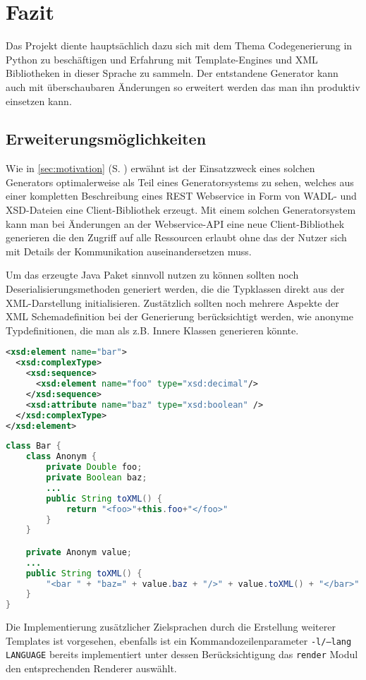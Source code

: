 \section{Fazit}
\label{sec:conclusion}

Das Projekt diente hauptsächlich dazu sich mit dem Thema Codegenerierung in Python zu beschäftigen und Erfahrung mit Template-Engines und XML Bibliotheken in dieser Sprache zu sammeln. Der entstandene Generator kann auch mit überschaubaren Änderungen so erweitert werden das man ihn produktiv einsetzen kann.

\subsection{Erweiterungsmöglichkeiten}
\label{sec:extension}

Wie in \cref{sec:motivation} (S. \pageref{sec:motivation}) erwähnt ist der Einsatzzweck eines solchen Generators optimalerweise als Teil eines Generatorsystems zu sehen, welches aus einer kompletten Beschreibung eines \gls{REST} Webservice in Form von \gls{WADL}- und \gls{XSD}-Dateien eine Client-Bibliothek erzeugt. Mit einem solchen Generatorsystem kann man bei Änderungen an der Webservice-API eine neue Client-Bibliothek generieren die den Zugriff auf alle Ressourcen erlaubt ohne das der Nutzer sich mit Details der Kommunikation auseinandersetzen muss. %

Um das erzeugte Java Paket sinnvoll nutzen zu können sollten noch Deserialisierungsmethoden generiert werden, die die Typklassen direkt aus der XML-Darstellung initialisieren. Zustätzlich sollten noch mehrere Aspekte der XML Schemadefinition bei der Generierung berücksichtigt werden, wie anonyme Typdefinitionen, die man als z.B. Innere Klassen generieren könnte.

\begin{lstlisting}[language=XML]
<xsd:element name="bar">
  <xsd:complexType>
    <xsd:sequence>
      <xsd:element name="foo" type="xsd:decimal"/>
    </xsd:sequence>
    <xsd:attribute name="baz" type="xsd:boolean" />
  </xsd:complexType>
</xsd:element>
\end{lstlisting}

\begin{lstlisting}[language=Java]
class Bar {
    class Anonym {
        private Double foo;
        private Boolean baz;
        ...
        public String toXML() {
            return "<foo>"+this.foo+"</foo>"
        }
    }

    private Anonym value;
    ...
    public String toXML() {
        "<bar " + "baz=" + value.baz + "/>" + value.toXML() + "</bar>"
    }
}
\end{lstlisting}

Die Implementierung zusätzlicher Zielsprachen durch die Erstellung weiterer Templates ist vorgesehen, ebenfalls ist ein Kommandozeilenparameter \texttt{-l/--lang LANGUAGE} bereits implementiert unter dessen Berücksichtigung das \texttt{render} Modul den entsprechenden Renderer auswählt.

